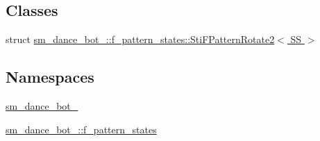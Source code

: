 \subsection*{Classes}
\begin{DoxyCompactItemize}
\item 
struct \hyperlink{classsm__dance__bot__2_1_1f__pattern__states_1_1StiFPatternRotate2}{sm\+\_\+dance\+\_\+bot\+\_\+::f\+\_\+pattern\+\_\+states\+::\+Sti\+F\+Pattern\+Rotate2$<$ S\+S $>$}
\end{DoxyCompactItemize}
\subsection*{Namespaces}
\begin{DoxyCompactItemize}
\item 
 \hyperlink{namespacesm__dance__bot__2}{sm\+\_\+dance\+\_\+bot\+\_}
\item 
 \hyperlink{namespacesm__dance__bot__2_1_1f__pattern__states}{sm\+\_\+dance\+\_\+bot\+\_\+::f\+\_\+pattern\+\_\+states}
\end{DoxyCompactItemize}
